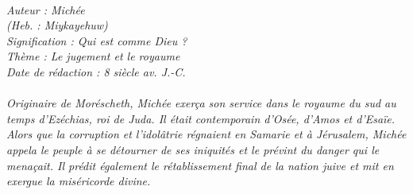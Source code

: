 \BFont
\noindent\hrulefill
{\footnotesize
\textit{
\bigskip
{\centering{}
\\Auteur : Michée
\\(Heb. : Miykayehuw)
\\Signification : Qui est comme Dieu ?
\\Thème : Le jugement et le royaume
\\Date de rédaction : 8 siècle av. J.-C.\\}
}
\textit{
\\Originaire de Moréscheth, Michée exerça son service dans le royaume du sud au temps d'Ezéchias, roi de Juda. Il était contemporain d'Osée, d'Amos et d'Esaïe. Alors que la corruption et l'idolâtrie régnaient en Samarie et à Jérusalem, Michée appela le peuple à se détourner de ses iniquités et le prévint du danger qui le menaçait. Il prédit également le rétablissement final de la nation juive et mit en exergue la miséricorde divine.\bigskip
}
}
\par\nobreak\noindent\hrulefill
